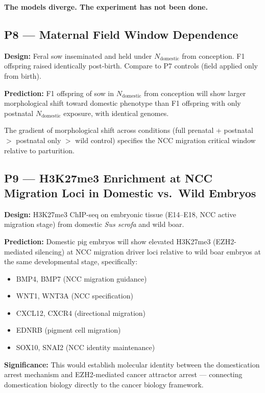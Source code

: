 \documentclass[11pt, a4paper]{article}
\begin{document}
\textbf{The models diverge. The experiment
has not been done.}

\subsection{P8 --- Maternal Field Window Dependence}

\textbf{Design:} Feral sow inseminated and held
under $N_{\text{domestic}}$ from conception.
F1 offspring raised identically post-birth.
Compare to P7 controls (field applied only
from birth).

\textbf{Prediction:} F1 offspring of sow in
$N_{\text{domestic}}$ from conception will show
larger morphological shift toward domestic phenotype
than F1 offspring with only postnatal
$N_{\text{domestic}}$ exposure, with identical genomes.

The gradient of morphological shift across conditions
(full prenatal + postnatal $>$ postnatal only $>$
wild control) specifies the NCC migration critical
window relative to parturition.

\subsection{P9 --- H3K27me3 Enrichment at NCC
Migration Loci in Domestic vs.\ Wild Embryos}

\textbf{Design:} H3K27me3 ChIP-seq on embryonic
tissue (E14--E18, NCC active migration stage)
from domestic \textit{Sus scrofa} and wild boar.

\textbf{Prediction:} Domestic pig embryos will
show elevated H3K27me3 (EZH2-mediated silencing)
at NCC migration driver loci relative to wild boar
embryos at the same developmental stage, specifically:

\begin{itemize}[itemsep=0.1em, noitemsep]
  \item BMP4, BMP7 (NCC migration guidance)
  \item WNT1, WNT3A (NCC specification)
  \item CXCL12, CXCR4 (directional migration)
  \item EDNRB (pigment cell migration)
  \item SOX10, SNAI2 (NCC identity maintenance)
\end{itemize}

\textbf{Significance:} This would establish
molecular identity between the domestication
arrest mechanism and EZH2-mediated cancer attractor
arrest --- connecting domestication biology directly
to the cancer biology framework.
\end{document}
